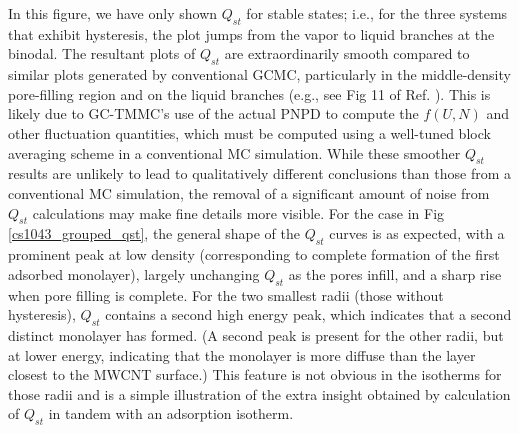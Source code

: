 In this figure, we have only shown $Q_{st}$ for stable states; i.e., for the three systems that exhibit hysteresis, the plot jumps from the vapor to liquid branches at the binodal. The resultant plots of $Q_{st}$ are extraordinarily smooth compared to similar plots generated by conventional GCMC, particularly in the middle-density pore-filling region and on the liquid branches (e.g., see Fig 11 of Ref. \cite{Wang_Study_2011}). This is likely due to GC-TMMC's use of the actual PNPD to compute the $f\left(U,N\right)$ and other fluctuation quantities, which must be computed using a well-tuned block averaging scheme in a conventional MC simulation. While these smoother $Q_{st}$ results are unlikely to lead to qualitatively different conclusions than those from a conventional MC simulation, the removal of a significant amount of noise from $Q_{st}$ calculations may make fine details more visible. For the case in Fig \ref{cs1043_grouped_qst}, the general shape of the $Q_{st}$ curves is as expected, with a prominent peak at low density (corresponding to complete formation of the first adsorbed monolayer), largely unchanging $Q_{st}$ as the pores infill, and a sharp rise when pore filling is complete. For the two smallest radii (those without hysteresis), $Q_{st}$ contains a second high energy peak, which indicates that a second distinct monolayer has formed. (A second peak is present for the other radii, but at lower energy, indicating that the monolayer is more diffuse than the layer closest to the MWCNT surface.)  This feature is not obvious in the isotherms for those radii and is a simple illustration of the extra insight obtained by calculation of $Q_{st}$ in tandem with an adsorption isotherm.

